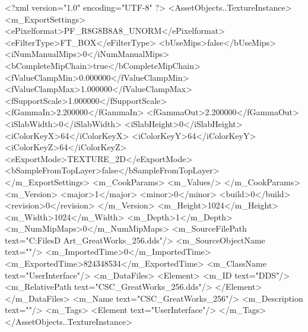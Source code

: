 <?xml version="1.0" encoding="UTF-8" ?>
<AssetObjects..TextureInstance>
	<m_ExportSettings>
		<ePixelformat>PF_R8G8B8A8_UNORM</ePixelformat>
		<eFilterType>FT_BOX</eFilterType>
		<bUseMips>false</bUseMips>
		<iNumManualMips>0</iNumManualMips>
		<bCompleteMipChain>true</bCompleteMipChain>
		<fValueClampMin>0.000000</fValueClampMin>
		<fValueClampMax>1.000000</fValueClampMax>
		<fSupportScale>1.000000</fSupportScale>
		<fGammaIn>2.200000</fGammaIn>
		<fGammaOut>2.200000</fGammaOut>
		<iSlabWidth>0</iSlabWidth>
		<iSlabHeight>0</iSlabHeight>
		<iColorKeyX>64</iColorKeyX>
		<iColorKeyY>64</iColorKeyY>
		<iColorKeyZ>64</iColorKeyZ>
		<eExportMode>TEXTURE_2D</eExportMode>
		<bSampleFromTopLayer>false</bSampleFromTopLayer>
	</m_ExportSettings>
	<m_CookParams>
		<m_Values/>
	</m_CookParams>
	<m_Version>
		<major>1</major>
		<minor>0</minor>
		<build>0</build>
		<revision>0</revision>
	</m_Version>
	<m_Height>1024</m_Height>
	<m_Width>1024</m_Width>
	<m_Depth>1</m_Depth>
	<m_NumMipMaps>0</m_NumMipMaps>
	<m_SourceFilePath text="C:\Users\Shadow\Desktop\Working Files\2D Art\GreatWorks\CSC_GreatWorks_256.dds"/>
	<m_SourceObjectName text=""/>
	<m_ImportedTime>0</m_ImportedTime>
	<m_ExportedTime>824348534</m_ExportedTime>
	<m_ClassName text="UserInterface"/>
	<m_DataFiles>
		<Element>
			<m_ID text="DDS"/>
			<m_RelativePath text="CSC_GreatWorks_256.dds"/>
		</Element>
	</m_DataFiles>
	<m_Name text="CSC_GreatWorks_256"/>
	<m_Description text=""/>
	<m_Tags>
		<Element text="UserInterface"/>
	</m_Tags>
</AssetObjects..TextureInstance>

